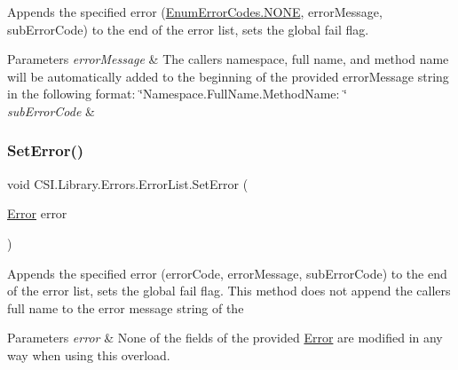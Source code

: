 Appends the specified error (\mbox{\hyperlink{namespace_c_s_i_1_1_library_1_1_errors_a5534735de1ef2256eb4c52c7440e30d7ab50339a10e1de285ac99d4c3990b8693}{Enum\+Error\+Codes.\+N\+O\+NE}}, error\+Message, sub\+Error\+Code) to the end of the error list, sets the global fail flag. 


\begin{DoxyParams}{Parameters}
{\em error\+Message} & The caller\textquotesingle{}s namespace, full name, and method name will be automatically added to the beginning of the provided error\+Message string in the following format\+: \char`\"{}\+Namespace.\+Full\+Name.\+Method\+Name\+: \char`\"{}\\
\hline
{\em sub\+Error\+Code} & \\
\hline
\end{DoxyParams}
\mbox{\label{class_c_s_i_1_1_library_1_1_errors_1_1_error_list_af906fa9d544734005f9cbe01485d5e5f}} 
\subsubsection{\texorpdfstring{SetError()}{SetError()}\hspace{0.1cm}{\footnotesize\ttfamily [3/3]}}
{\footnotesize\ttfamily void C\+S\+I.\+Library.\+Errors.\+Error\+List.\+Set\+Error (\begin{DoxyParamCaption}\item[{\mbox{\hyperlink{class_c_s_i_1_1_library_1_1_errors_1_1_error}{Error}}}]{error }\end{DoxyParamCaption})\hspace{0.3cm}{\ttfamily [inline]}}



Appends the specified error (error\+Code, error\+Message, sub\+Error\+Code) to the end of the error list, sets the global fail flag. This method does not append the caller\textquotesingle{}s full name to the error message string of the 


\begin{DoxyParams}{Parameters}
{\em error} & None of the fields of the provided \mbox{\hyperlink{class_c_s_i_1_1_library_1_1_errors_1_1_error}{Error}} are modified in any way when using this overload.\\
\hline
\end{DoxyParams}
\mbox{\label{class_c_s_i_1_1_library_1_1_errors_1_1_error_list_a61a012335bd3bea9beaa53dadcb9209a}} 

